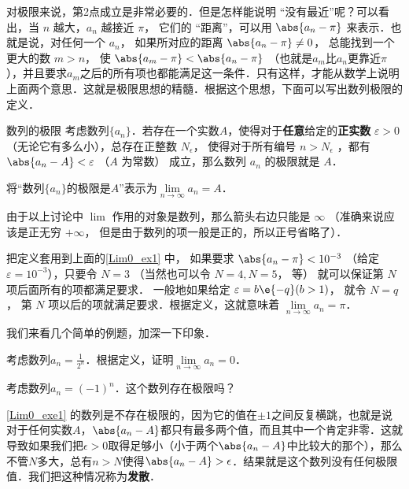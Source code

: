 对极限来说，第2点成立是非常必要的．但是怎样能说明 “没有最近”呢？可以看出，当 $n$ 越大，$a_n$ 越接近 $\pi$， 它们的 “距离”，可以用 $\abs{a_n - \pi}$ 来表示．也就是说，对任何一个 $a_n$， 如果所对应的距离 $\abs{a_n - \pi } \ne 0$， 总能找到一个更大的数 $m>n$， 使 $\abs{a_m - \pi} < \abs{a_n - \pi}$ （也就是$a_m$比$a_n$更靠近$\pi$），并且要求$a_m$之后的所有项也都能满足这一条件．只有这样，才能从数学上说明上面两个意思．这就是极限思想的精髓．根据这个思想，下面可以写出数列极限的定义．



\begin{definition}{数列的极限}\label{Lim0_def2}
考虑数列$\{a_n\}$．若存在一个实数$A$，使得对于\textbf{任意}给定的\textbf{正实数} $\varepsilon > 0$（无论它有多么小），总存在正整数 $N_\epsilon$， 使得对于所有编号 $n>N_\epsilon$ ，都有 $\abs{a_n - A} < \varepsilon$ （$A$ 为常数） 成立，那么数列 $a_n$ 的极限就是 $A$．

将“数列$\{a_n\}$的极限是$A$”表示为$\lim\limits_{n\to\infty}a_n=A$．
\end{definition}
 


由于以上讨论中 $\lim$ 作用的对象是数列，那么箭头右边只能是 $\infty$ （准确来说应该是正无穷 $+\infty$， 但是由于数列的项一般是正的，所以正号省略了）．

把定义套用到上面的\autoref{Lim0_ex1} 中， 如果要求 $\abs{a_n - \pi} < 10^{-3}$ （给定 $\varepsilon  = 10^{-3}$），只要令 $N=3$ （当然也可以令 $N=4, N=5$， 等） 就可以保证第 $N$ 项后面所有的项都满足要求． 一般地如果给定 $\varepsilon  = b\e{-q}  (b > 1)$， 就令 $N = q$， 第 $N$ 项以后的项就满足要求．根据定义，这就意味着 $\lim\limits_{n \to \infty } a_n = \pi$． 

我们来看几个简单的例题，加深一下印象．

\begin{exercise}{}
考虑数列$a_n=\frac{1}{2^n}$．根据定义，证明$\lim\limits_{n\to\infty}a_n=0$．
\end{exercise}

\begin{exercise}{}\label{Lim0_exe1}
考虑数列$a_n=(-1)^n$．这个数列存在极限吗？
\end{exercise}

\autoref{Lim0_exe1} 的数列是不存在极限的，因为它的值在$\pm 1$之间反复横跳，也就是说对于任何实数$A$，$\abs{a_n-A}$都只有最多两个值，而且其中一个肯定非零．这就导致如果我们把$\epsilon>0$取得足够小（小于两个$\abs{a_n-A}$中比较大的那个），那么不管$N$多大，总有$n>N$使得$\abs{a_n-A}>\epsilon$．结果就是这个数列没有任何极限值．我们把这种情况称为\textbf{发散}．

